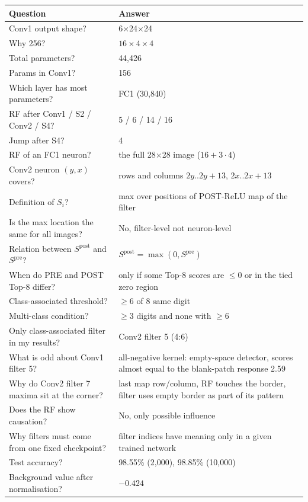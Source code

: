 \documentclass[11pt]{article}
\begin{document}
\begin{tabular}{p{7.2cm}p{8cm}}
\toprule
Question & Answer \\
\midrule
Conv1 output shape? & 6$\times$24$\times$24 \\
Why 256? & $16\times4\times4$ \\
Total parameters? & 44,426 \\
Params in Conv1? & 156 \\
Which layer has most parameters? & FC1 (30,840) \\
RF after Conv1 / S2 / Conv2 / S4? & 5 / 6 / 14 / 16 \\
Jump after S4? & 4 \\
RF of an FC1 neuron? & the full 28$\times$28 image ($16+3\cdot4$) \\
Conv2 neuron $(y,x)$ covers? & rows and columns $2y..2y+13$, $2x..2x+13$ \\
Definition of $S_i$? & max over positions of POST-ReLU map of the filter \\
Is the max location the same for all images? & No, filter-level not neuron-level \\
Relation between $S^{\text{post}}$ and $S^{\text{pre}}$? & $S^{\text{post}}=\max(0,S^{\text{pre}})$ \\
When do PRE and POST Top-8 differ? & only if some Top-8 scores are $\le0$ or in the tied zero region \\
Class-associated threshold? & $\ge6$ of 8 same digit \\
Multi-class condition? & $\ge3$ digits and none with $\ge6$ \\
Only class-associated filter in my results? & Conv2 filter 5 (4:6) \\
What is odd about Conv1 filter 5? & all-negative kernel: empty-space detector, scores almost equal to the blank-patch response 2.59 \\
Why do Conv2 filter 7 maxima sit at the corner? & last map row/column, RF touches the border, filter uses empty border as part of its pattern \\
Does the RF show causation? & No, only possible influence \\
Why filters must come from one fixed checkpoint? & filter indices have meaning only in a given trained network \\
Test accuracy? & 98.55\% (2,000), 98.85\% (10,000) \\
Background value after normalisation? & $-0.424$ \\
\bottomrule
\end{tabular}
\end{document}
